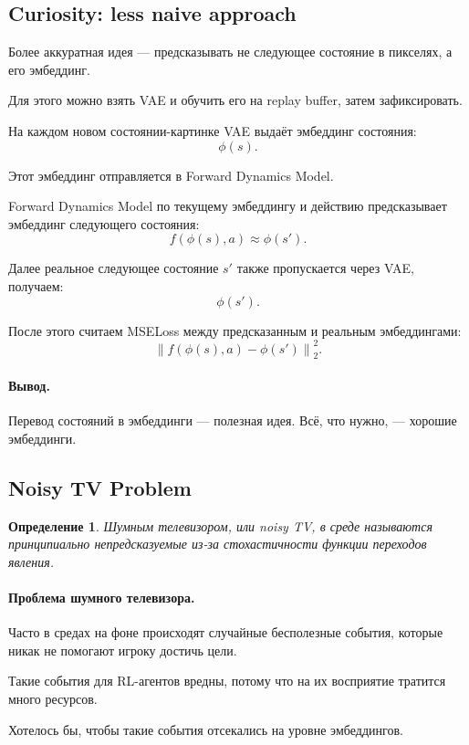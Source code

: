 \documentclass[12pt,a4paper]{article}
\newtheorem{definition}{Определение}
\begin{document}
\subsection{Curiosity: less naive approach}

Более аккуратная идея --- предсказывать не следующее состояние в пикселях, а его эмбеддинг.

Для этого можно взять VAE и обучить его на replay buffer, затем зафиксировать.

На каждом новом состоянии-картинке VAE выдаёт эмбеддинг состояния:
\[
\phi(s).
\]

Этот эмбеддинг отправляется в Forward Dynamics Model.

Forward Dynamics Model по текущему эмбеддингу и действию предсказывает эмбеддинг следующего состояния:
\[
f(\phi(s),a)
\approx
\phi(s').
\]

Далее реальное следующее состояние $s'$ также пропускается через VAE, получаем:
\[
\phi(s').
\]

После этого считаем MSELoss между предсказанным и реальным эмбеддингами:
\[
\left\|
f(\phi(s),a)-\phi(s')
\right\|_2^2.
\]

\paragraph{Вывод.}

Перевод состояний в эмбеддинги --- полезная идея. Всё, что нужно, --- хорошие эмбеддинги.

\subsection{Noisy TV Problem}

\begin{definition}
Шумным телевизором, или noisy TV, в среде называются принципиально непредсказуемые из-за стохастичности функции переходов явления.
\end{definition}

\paragraph{Проблема шумного телевизора.}

Часто в средах на фоне происходят случайные бесполезные события, которые никак не помогают игроку достичь цели.

Такие события для RL-агентов вредны, потому что на их восприятие тратится много ресурсов.

Хотелось бы, чтобы такие события отсекались на уровне эмбеддингов.
\end{document}
